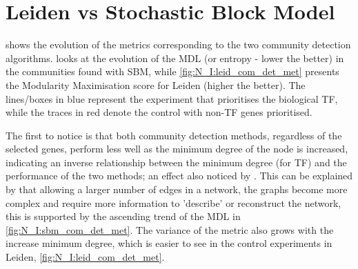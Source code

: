 \section{Leiden vs Stochastic Block Model} \label{s:N_I:sel_tf_com_det}

 shows the evolution of the metrics corresponding to the two community detection algorithms.  looks at the evolution of the MDL (or entropy - lower the better) in the communities found with SBM, while \cref{fig:N_I:leid_com_det_met} presents the Modularity Maximisation score for Leiden (higher the better). The lines/boxes in blue represent the experiment that prioritises the biological TF, while the traces in red denote the control with non-TF genes prioritised. 

The first to notice is that both community detection methods, regardless of the selected genes, perform less well as the minimum degree of the node is increased, indicating an inverse relationship between the minimum degree (for TF) and the performance of the two methods; an effect also noticed by \citet{Care2019-ij}. This can be explained by that allowing a larger number of edges in a network, the graphs become more complex and require more information to 'describe' or reconstruct the network, this is supported by the ascending trend of the MDL in \cref{fig:N_I:sbm_com_det_met}. The variance of the metric also grows with the increase minimum degree, which is easier to see in the control experiments in Leiden, \cref{fig:N_I:leid_com_det_met}.

